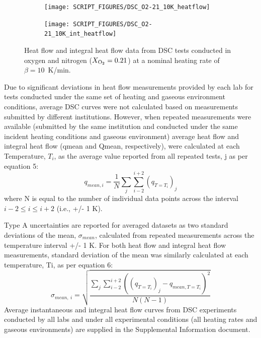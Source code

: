 \documentclass{book}
\begin{document}
\begin{figure}
\centering
\begin{subfigure}[b]{0.85\textwidth}
   \texttt{[image: SCRIPT\_FIGURES/DSC\_O2-21\_10K\_heatflow]}
   \caption{}
   \label{Fig:DSC_O2-21_10K_heatflow} 
\end{subfigure}

\begin{subfigure}[b]{0.85\textwidth}
   \texttt{[image: SCRIPT\_FIGURES/DSC\_O2-21\_10K\_int\_heatflow]}
   \caption{}
   \label{Fig:DSC_O2-21_10K_int_heatflow} 
\end{subfigure} 
  
  \caption{Heat flow and integral heat flow data from DSC tests conducted in oxygen and nitrogen ($X_{\rm O_2}=0.21$) at a nominal heating rate of $\beta=10$~K/min.}
  \label{Fig:DSC_O2-21_10K}
\end{figure}



Due to significant deviations  in heat flow measurements provided by each lab for tests conducted under the same set of heating and gaseous environment conditions, average DSC curves were not calculated based on measurements submitted by different institutions. However, when repeated measurements were available (submitted by the same institution and conducted under the same incident heating conditions and gaseous environment) average heat flow and integral heat flow (qmean and Qmean, respectively), were calculated at each Temperature, $T_i$, as the average value reported from all repeated tests, j  as per equation 5:
\begin{equation}
   q_{mean,i}=\frac{1}{N}\sum_{j}\sum_{i-2}^{i+2}\left(q_{T=T_i}\right)_j
\end{equation}
where N is equal to the number of individual data points across the interval $i-2 \le i \le i+2$ (i.e., +/- 1 K).

Type A uncertainties are reported for averaged datasets as two standard deviations of the mean, $\sigma_{mean}$, calculated from repeated measurements across the temperature interval +/- 1 K. For both heat flow and integral heat flow measurements, standard deviation of the mean was similarly calculated at each temperature, Ti, as per equation 6:
\begin{equation}
   \sigma_{mean,\ i}=\sqrt{\frac{\sum_{j}\sum_{i-2}^{i+2}\left(\left(q_{T=T_i}\right)_j-q_{mean,T=T_i}\right)^2}{N\left(N-1\right)}}
\end{equation}
Average instantaneous and integral heat flow curves from DSC experiments conducted by all labs and under all experimental conditions (all heating rates and gaseous environments) are supplied in the Supplemental Information document.
\end{document}
